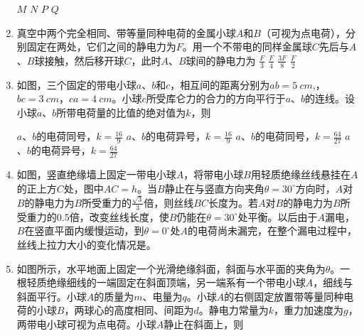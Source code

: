 \begin{enumerate}[leftmargin=0em]
\fourchoices
{$ M $}
{$ N $}
{$ P $}
{$ Q $}





\item
{}
真空中两个完全相同、带等量同种电荷的金属小球$ A $和$ B $（可视为点电荷），分别固定在两处，它们之间的静电力为$ F $。用一个不带电的同样金属球$ C $先后与$ A $、$ B $球接触，然后移开球$ C $，此时$ A $、$ B $球间的静电力为  
\fourchoices
{$ \frac{F}{3} $}
{$ \frac{F}{4} $}
{$ \frac{3F}{8} $}
{$ \frac{F}{2} $}






\item
{}
如图，三个固定的带电小球$ a $、$ b $和$ c $，相互间的距离分别为$ ab=5 \ cm $,，$ bc=3 \ cm $，$ ca=4 \ cm $。小球$ c $所受库仑力的合力的方向平行于$ a $、$ b $的连线。设小球$ a $、$ b $所带电荷量的比值的绝对值为$ k $，则  
\begin{figure}[h!]
\centering

\end{figure}

\fourchoices
{$ a $、$ b $的电荷同号，$k = \frac { 16 } { 9 }$}
{$ a $、$ b $的电荷异号，$k = \frac { 16 } { 9 }$}
{$ a $、$ b $的电荷同号，$k = \frac { 64 } { 27 }$}
{$ a $、$ b $的电荷异号，$k = \frac { 64 } { 27 }$}





\item
{}
如图，竖直绝缘墙上固定一带电小球$ A $，将带电小球$ B $用轻质绝缘丝线悬挂在$ A $的正上方$ C $处，图中$ AC=h $。当$ B $静止在与竖直方向夹角$ \theta =30 ^{ \circ } $方向时，$ A $对$ B $的静电力为$ B $所受重力的$\frac { \sqrt { 3 } } { 3 }$倍，则丝线$ BC $长度为。若$ A $对$ B $的静电力为$ B $所受重力的$ 0.5 $倍，改变丝线长度，使$ B $仍能在$ \theta =30 ^{ \circ } $处平衡。以后由于$ A $漏电，$ B $在竖直平面内缓慢运动，到$ \theta =0 ^{ \circ } $处$ A $的电荷尚未漏完，在整个漏电过程中，丝线上拉力大小的变化情况是。
\begin{figure}[h!]
\centering

\end{figure}




\item
{}
如图所示，水平地面上固定一个光滑绝缘斜面，斜面与水平面的夹角为$ \theta $。一根轻质绝缘细线的一端固定在斜面顶端，另一端系有一个带电小球$ A $，细线与斜面平行。小球$ A $的质量为$ m $、电量为$ q $。小球$ A $的右侧固定放置带等量同种电荷的小球$ B $，两球心的高度相同、间距为$ d $。静电力常量为$ k $，重力加速度为$ g $，两带电小球可视为点电荷。小球$ A $静止在斜面上，则  
\begin{figure}[h!]
\centering

\end{figure}


\end{enumerate}
